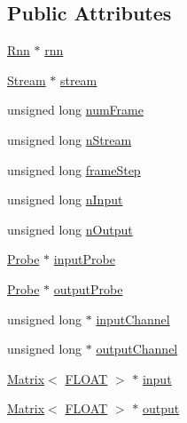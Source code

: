 \subsection*{Public Attributes}
\begin{DoxyCompactItemize}
\item 
\hyperlink{classfractal_1_1Rnn}{Rnn} $\ast$ \hyperlink{classfractal_1_1EvaluateArgs_aaf7bd34d480385ed5d821673f60f41d5}{rnn}
\item 
\hyperlink{classfractal_1_1Stream}{Stream} $\ast$ \hyperlink{classfractal_1_1EvaluateArgs_a5753c9c7878403d1d72f2f6fa248345d}{stream}
\item 
unsigned long \hyperlink{classfractal_1_1EvaluateArgs_a3ec9fe1a96427e11893c7d112f0772a3}{num\+Frame}
\item 
unsigned long \hyperlink{classfractal_1_1EvaluateArgs_a3cff560e1489ef23f330cde1401cfa17}{n\+Stream}
\item 
unsigned long \hyperlink{classfractal_1_1EvaluateArgs_ad1a758b48f7b8980d205cc0d2184aca7}{frame\+Step}
\item 
unsigned long \hyperlink{classfractal_1_1EvaluateArgs_a4e30174710dd14fd17280950c0e56f01}{n\+Input}
\item 
unsigned long \hyperlink{classfractal_1_1EvaluateArgs_acadb8c401ebd94bf13b410337e5bd48f}{n\+Output}
\item 
\hyperlink{classfractal_1_1Probe}{Probe} $\ast$ \hyperlink{classfractal_1_1EvaluateArgs_a167edb46a0b2b2810369a8ac9ae16b34}{input\+Probe}
\item 
\hyperlink{classfractal_1_1Probe}{Probe} $\ast$ \hyperlink{classfractal_1_1EvaluateArgs_a40445d2ce74fd96775037b13046ec349}{output\+Probe}
\item 
unsigned long $\ast$ \hyperlink{classfractal_1_1EvaluateArgs_a04e555137e4ae34be8c8e1d99c8a1fde}{input\+Channel}
\item 
unsigned long $\ast$ \hyperlink{classfractal_1_1EvaluateArgs_a5ab52cd8a035d8a83c0067a52c3fbb48}{output\+Channel}
\item 
\hyperlink{classfractal_1_1Matrix}{Matrix}$<$ \hyperlink{namespacefractal_a1c2d2530689575d5ccb56bae52af70d3}{F\+L\+O\+A\+T} $>$ $\ast$ \hyperlink{classfractal_1_1EvaluateArgs_a4a07d1045a8616deccf1329674dbdd2f}{input}
\item 
\hyperlink{classfractal_1_1Matrix}{Matrix}$<$ \hyperlink{namespacefractal_a1c2d2530689575d5ccb56bae52af70d3}{F\+L\+O\+A\+T} $>$ $\ast$ \hyperlink{classfractal_1_1EvaluateArgs_a1d08b06d5c6c57834227a770b86ce9cc}{output}
\item 

\end{DoxyCompactItemize}
